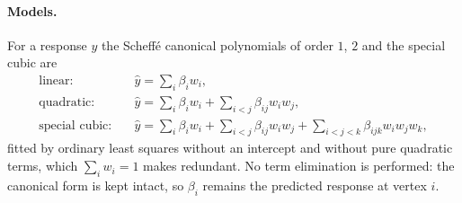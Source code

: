 \paragraph{Models.} For a response $y$ the Scheff\'e canonical polynomials of order $1$, $2$ and the special cubic are
\begin{align}
\text{linear:}\quad & \hat y = \sum_i \beta_i w_i, \\
\text{quadratic:}\quad & \hat y = \sum_i \beta_i w_i + \sum_{i<j} \beta_{ij} w_i w_j, \label{eq:scheffequad}\\
\text{special cubic:}\quad & \hat y = \sum_i \beta_i w_i + \sum_{i<j} \beta_{ij} w_i w_j + \sum_{i<j<k} \beta_{ijk} w_i w_j w_k,
\end{align}
fitted by ordinary least squares without an intercept and without pure quadratic terms, which $\sum_i w_i = 1$ makes
redundant. No term elimination is performed: the canonical form is kept intact, so $\beta_i$ remains the predicted
response at vertex $i$.

